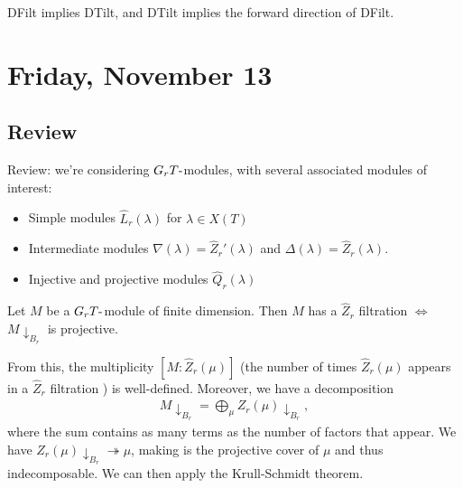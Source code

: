 \begin{proposition}

DFilt implies DTilt, and DTilt implies the forward direction of DFilt.

\end{proposition}

\hypertarget{friday-november-13}{%
\section{Friday, November 13}\label{friday-november-13}}

\hypertarget{review-3}{%
\subsection{Review}\label{review-3}}

Review: we're considering \(G_r T{\hbox{-}}\)modules, with several
associated modules of interest:

\begin{itemize}
\tightlist
\item
  Simple modules \(\widehat{L}_r(\lambda)\) for \(\lambda \in X(T)\)
\item
  Intermediate modules \(\nabla(\lambda) = \widehat{Z}_r'(\lambda)\) and
  \(\Delta(\lambda) = \widehat{Z}_r(\lambda)\).
\item
  Injective and projective modules \(\widehat{Q}_r(\lambda)\)
\end{itemize}

\begin{theorem}[?]

Let \(M\) be a \(G_r T{\hbox{-}}\)module of finite dimension. Then \(M\)
has a \(\widehat{Z}_r\) filtration \(\iff\) \(M\downarrow_{B_r}\) is
projective.

\end{theorem}

\begin{remark}

From this, the multiplicity \([M: \widehat{Z}_r(\mu)]\) (the number of
times \(\widehat{Z}_r(\mu)\) appears in a \(\widehat{Z}_r\) filtration )
is well-defined. Moreover, we have a decomposition
\begin{align*}  
M\downarrow_{B_r} = \bigoplus_{\mu} Z_r(\mu)\downarrow_{B_r}
,\end{align*}
where the sum contains as many terms as the number of factors that
appear. We have \(Z_r(\mu)\downarrow_{B_r} \twoheadrightarrow\mu\),
making is the projective cover of \(\mu\) and thus indecomposable. We
can then apply the Krull-Schmidt theorem.

\end{remark}

